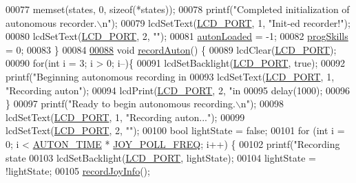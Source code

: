 \begin{DoxyCode}
{{{00077     memset(states, 0, \textcolor{keyword}{sizeof}(*states));
00078     printf(\textcolor{stringliteral}{"Completed initialization of autonomous recorder.\(\backslash\)n"});
00079     lcdSetText(\hyperlink{lcdmsg_8h_abcf42bd88b3c36193f301ca25b033875}{LCD\_PORT}, 1, \textcolor{stringliteral}{"Init-ed recorder!"});
00080     lcdSetText(\hyperlink{lcdmsg_8h_abcf42bd88b3c36193f301ca25b033875}{LCD\_PORT}, 2, \textcolor{stringliteral}{""});
00081     \hyperlink{autonrecorder_8c_a4e72d907ee74449b71b5e20943f4217e}{autonLoaded} = -1;
00082     \hyperlink{autonrecorder_8c_aa2eda471576bdbaf33835a71da9bc616}{progSkills} = 0;
00083 \}
00084 
\hypertarget{autonrecorder_8c_source.tex_l00088}{}\hyperlink{autonrecorder_8h_a1611f78b8c904848dcc98ae4b0b5b22b}{00088} \textcolor{keywordtype}{void} \hyperlink{autonrecorder_8c_a1611f78b8c904848dcc98ae4b0b5b22b}{recordAuton}() \{
00089     lcdClear(\hyperlink{lcdmsg_8h_abcf42bd88b3c36193f301ca25b033875}{LCD\_PORT});
00090     \textcolor{keywordflow}{for}(\textcolor{keywordtype}{int} i = 3; i > 0; i--)\{
00091         lcdSetBacklight(\hyperlink{lcdmsg_8h_abcf42bd88b3c36193f301ca25b033875}{LCD\_PORT}, \textcolor{keyword}{true});
00092         printf(\textcolor{stringliteral}{"Beginning autonomous recording in %
00093         lcdSetText(\hyperlink{lcdmsg_8h_abcf42bd88b3c36193f301ca25b033875}{LCD\_PORT}, 1, \textcolor{stringliteral}{"Recording auton"});
00094         lcdPrint(\hyperlink{lcdmsg_8h_abcf42bd88b3c36193f301ca25b033875}{LCD\_PORT}, 2, \textcolor{stringliteral}{"in %
00095         delay(1000);
00096     \}
00097     printf(\textcolor{stringliteral}{"Ready to begin autonomous recording.\(\backslash\)n"});
00098     lcdSetText(\hyperlink{lcdmsg_8h_abcf42bd88b3c36193f301ca25b033875}{LCD\_PORT}, 1, \textcolor{stringliteral}{"Recording auton..."});
00099     lcdSetText(\hyperlink{lcdmsg_8h_abcf42bd88b3c36193f301ca25b033875}{LCD\_PORT}, 2, \textcolor{stringliteral}{""});
00100     \textcolor{keywordtype}{bool} lightState = \textcolor{keyword}{false};
00101     \textcolor{keywordflow}{for} (\textcolor{keywordtype}{int} i = 0; i < \hyperlink{autonrecorder_8h_aa19f7c427989a0a67f55958c610d0355}{AUTON\_TIME} * \hyperlink{autonrecorder_8h_a3d2260a30e7ce727bef0402edee4b205}{JOY\_POLL\_FREQ}; i++) \{
00102         printf(\textcolor{stringliteral}{"Recording state %
00103         lcdSetBacklight(\hyperlink{lcdmsg_8h_abcf42bd88b3c36193f301ca25b033875}{LCD\_PORT}, lightState);
00104         lightState = !lightState;
00105         \hyperlink{opcontrol_8c_a7e408f7d4d3cf1d5a4f6c9f1bae6e770}{recordJoyInfo}();
}}}}}}
\end{DoxyCode}
